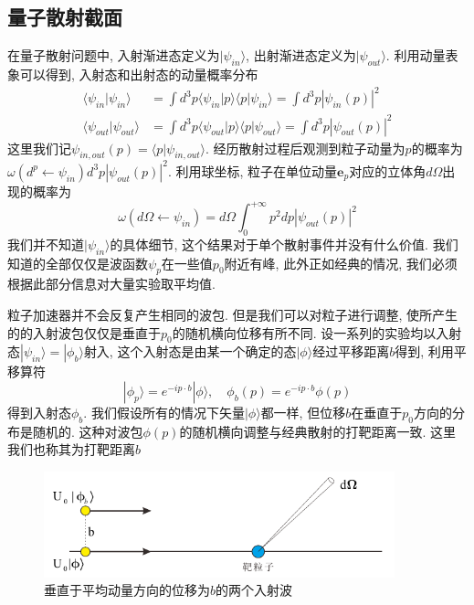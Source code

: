 \documentclass[a4paper,11pt]{book}
\begin{document}
\subsection{量子散射截面}
在量子散射问题中, 入射渐进态定义为$|\psi_{in}\rangle$, 出射渐进态定义为$|\psi_{out}\rangle$. 利用动量表象可以得到, 入射态和出射态的动量概率分布
\begin{equation}
  \begin{split}
     \langle\psi_{in}|\psi_{in}\rangle&=\int d^3p\langle\psi_{in}|p\rangle\langle p|\psi_{in}\rangle=\int d^3p|\psi_{in}(p)|^2\\
     \langle\psi_{out}|\psi_{out}\rangle&=\int d^3p\langle\psi_{out}|p\rangle\langle p|\psi_{out}\rangle=\int d^3p|\psi_{out}(p)|^2
  \end{split}
\end{equation}
这里我们记$\psi_{in,out}(p)=\langle p|\psi_{in,out}\rangle$. 经历散射过程后观测到粒子动量为$p$的概率为$\omega(d^p\leftarrow\psi_{in})d^3p|\psi_{out}(p)|^2$. 利用球坐标, 粒子在单位动量$\mathbf{e}_{p}$对应的立体角$d\Omega$出现的概率为
\begin{equation}\label{scatter amp}
  \omega(d\Omega\leftarrow\psi_{in})=d\Omega\int_{0}^{+\infty}p^2dp|\psi_{out}(p)|^2
\end{equation}
我们并不知道$|\psi_{in}\rangle$的具体细节, 这个结果对于单个散射事件并没有什么价值. 我们知道的全部仅仅是波函数$\psi_{p}$在一些值$p_0$附近有峰, 此外正如经典的情况, 我们必须根据此部分信息对大量实验取平均值.

粒子加速器并不会反复产生相同的波包. 但是我们可以对粒子进行调整, 使所产生的的入射波包仅仅是垂直于$p_0$的随机横向位移有所不同. 设一系列的实验均以入射态$|\psi_{in}\rangle=|\phi_b\rangle$射入, 这个入射态是由某一个确定的态$|\phi\rangle$经过平移距离$b$得到, 利用平移算符
\begin{equation}
  |\phi_p\rangle=e^{-ip\cdot b}|\phi\rangle,\quad\phi_b(p)=e^{-ip\cdot b}\phi(p)
\end{equation}
得到入射态$\phi_b$. 我们假设所有的情况下矢量$|\phi\rangle$都一样, 但位移$b$在垂直于$p_0$方向的分布是随机的. 这种对波包$\phi(p)$的随机横向调整与经典散射的打靶距离一致. 这里我们也称其为打靶距离$b$
\begin{figure}[H]
  \centering
  \includegraphics[width=4in]{fig12.pdf}
  \caption{垂直于平均动量方向的位移为$b$的两个入射波}\label{fig12}
\end{figure}
\end{document}
